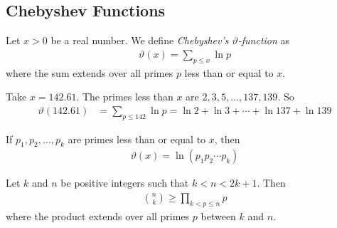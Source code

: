 
\subsection{Chebyshev Functions}
	\begin{definition}
		Let $x>0$ be a real number. We define \textit{Chebyshev's $\vartheta$-function} as
			\begin{align*}
				\vartheta(x)= \sum_{p \leq x} \ln p
			\end{align*}
		where the sum extends over all primes $p$ less than or equal to $x$.
	\end{definition}

	\begin{example}
		Take $x=142.61$. The primes less than $x$ are $2, 3, 5, \ldots, 137, 139$. So
			\begin{align*}
				\vartheta(142.61)&=\sum_{p \leq 142} \ln p = \ln 2 + \ln 3 + \cdots + \ln 137 + \ln 139
			\end{align*}
	\end{example}

	\begin{corollary}
		If $p_1, p_2, \ldots, p_k$ are primes less than or equal to $x$, then
			\begin{align*}
			\vartheta(x)= \ln \left( p_1p_2\cdots p_k\right)
			\end{align*}
	\end{corollary}

	\begin{lemma}
		\label{lem:binomialprimeinequality}
		Let $k$ and $n$ be positive integers such that $k<n < 2k+1 $. Then
			\begin{align*}
				\binom{n}{k} \geq \prod_{k < p \leq n} p
			\end{align*}
		where the product extends over all primes $p$ between $k$ and $n$.
	\end{lemma}

